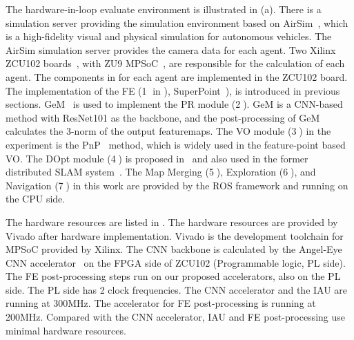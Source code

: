 The hardware-in-loop evaluate environment is illustrated in (a). There is a simulation server providing the simulation environment based on AirSim~\cite{shah2018airsim}, which is a high-fidelity visual and physical simulation for autonomous vehicles. The AirSim simulation server provides the camera data for each agent. Two Xilinx ZCU102 boards~\cite{zcu102}, with ZU9 MPSoC~\cite{MPSoC}, are responsible for the calculation of each agent. 
The components in  for each agent are implemented in the ZCU102 board. The implementation of the FE (\textcircled{1} in ), SuperPoint~\cite{detone2018superpoint}), is introduced in previous sections. GeM~\cite{radenovic2018fine} is used to implement the PR module (\textcircled{2}). GeM is a CNN-based method with ResNet101 as the backbone, and the post-processing of GeM calculates the 3-norm of the output featuremaps.
The VO module (\textcircled{3}) in the experiment is the PnP~\cite{LepetitMoreno-Noguer-EPnP} method, which is widely used in the feature-point based VO. 
The DOpt module (\textcircled{4}) is proposed in~\cite{Choudhary:2017e66} and also used in the former distributed SLAM system~\cite{cieslewski2018data}. 
The Map Merging (\textcircled{5}), Exploration (\textcircled{6}), and Navigation (\textcircled{7}) in this work are provided by the ROS framework and running on the CPU side. 

The hardware resources are listed in . The hardware resources are provided by Vivado after hardware implementation. Vivado is the development toolchain for MPSoC provided by Xilinx. The CNN backbone is calculated by the Angel-Eye CNN accelerator~\cite{guo2017angel} on the FPGA side of ZCU102 (Programmable logic, PL side). The FE post-processing steps run on our proposed accelerators, also on the PL side. The PL side has 2 clock frequencies. The CNN accelerator and the IAU are running at 300MHz. The accelerator for FE post-processing is running at 200MHz. Compared with the CNN accelerator, IAU and FE post-processing use minimal hardware resources.

